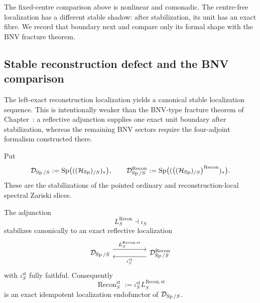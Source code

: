 The fixed-centre comparison above is nonlinear and comonadic. The centre-free
localization has a different stable shadow: after stabilization, its unit has an exact
fibre. We record that boundary next and compare only its formal shape with the BNV
fracture theorem.

\subsection{Stable reconstruction defect and the BNV comparison}
\label{subsec:stable-reconstruction-defect-bnv}

The left-exact reconstruction localization yields a canonical stable localization
sequence. This is intentionally weaker than the BNV-type fracture theorem of
Chapter~: a reflective adjunction supplies
one exact unit boundary after stabilization, whereas the remaining BNV sectors require
the four-adjoint formalism constructed there.

\begin{definition}
\label{def:stable-reconstruction-categories}
Put
\[
    \mathcal D_{\operatorname{Sp}/S}
    :=
    \operatorname{Sp}\bigl(((\mathcal H_{\operatorname{Sp}})_{/S})_*\bigr),
    \qquad
    \mathcal D^{\mathrm{Recon}}_{\operatorname{Sp}/S}
    :=
    \operatorname{Sp}\bigl((\bigl((\mathcal H_{\operatorname{Sp}})_{/S}\bigr)^{\mathrm{Recon}})_*\bigr).
\]
These are the stabilizations of the pointed ordinary and reconstruction-local
spectral Zariski slices.
\end{definition}

\begin{theorem}
\label{thm:stable-reconstruction-localization}
The adjunction
\[
    L^{\mathrm{Recon}}_S
    \dashv
    \iota_S
\]
stabilizes canonically to an exact reflective localization
\[
\begin{tikzcd}[column sep=huge]
    \mathcal D_{\Sp/S}
        \arrow[r,shift left=1.2ex,"L^{\mathrm{Recon},\mathrm{st}}_S"]
        &
    \mathcal D^{\mathrm{Recon}}_{\Sp/S}
        \arrow[l,shift left=1.2ex,"\iota^{\mathrm{st}}_S"]
\end{tikzcd}
\]
with \(\iota^{\mathrm{st}}_S\) fully faithful. Consequently
\[
    \operatorname{Recon}^{\mathrm{st}}_S
    :=
    \iota^{\mathrm{st}}_S
    L^{\mathrm{Recon},\mathrm{st}}_S
\]
is an exact idempotent localization endofunctor of \(\mathcal D_{\operatorname{Sp}/S}\).
\end{theorem}

